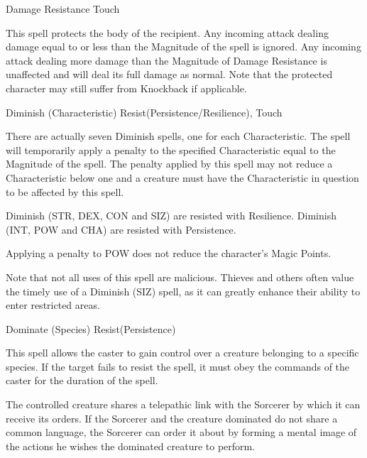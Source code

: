 \begin{samepage}
\begin{rpg-spell}
{Damage Resistance}
{Touch}

This spell protects the body of the recipient. Any incoming attack dealing damage equal to or less than the Magnitude of the spell is ignored. Any incoming attack dealing more damage than the Magnitude of Damage Resistance is unaffected and will deal its full damage as normal. Note that the protected character may still suffer from Knockback if applicable. 
\end{rpg-spell}
\end{samepage}


\begin{samepage}
\begin{rpg-spell}
{Diminish (Characteristic)}
{Resist(Persistence/Resilience), Touch}

There are actually seven Diminish spells, one for each Characteristic. The spell will temporarily apply a penalty to the specified Characteristic equal to the Magnitude of the spell. The penalty applied by this spell may not reduce a Characteristic below one and a creature must have the Characteristic in question to be affected by this spell. 

Diminish (STR, DEX, CON and SIZ) are resisted with Resilience. Diminish (INT, POW and CHA) are resisted with Persistence. 

Applying a penalty to POW does not reduce the character’s Magic Points.

Note that not all uses of this spell are malicious. Thieves and others often value the timely use of a Diminish (SIZ) spell, as it can greatly enhance their ability to enter restricted areas. 
\end{rpg-spell}
\end{samepage}


\begin{samepage}
\begin{rpg-spell}
{Dominate (Species)}
{Resist(Persistence)}

This spell allows the caster to gain control over a creature belonging to a specific species. If the target fails to resist the spell, it must obey the commands of the caster for the duration of the spell. 

The controlled creature shares a telepathic link with the Sorcerer by which it can receive its orders. If the Sorcerer and the creature dominated do not share a common language, the Sorcerer can order it about by forming a mental image of the actions he wishes the dominated creature to perform.
\end{rpg-spell}
\end{samepage}


